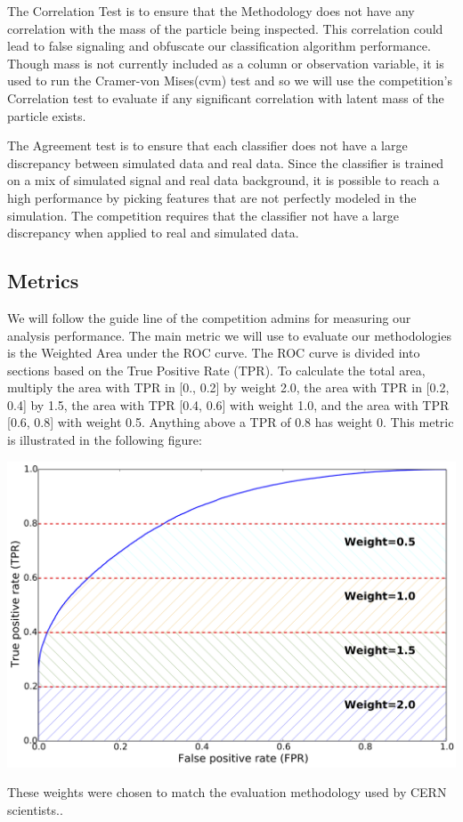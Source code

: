 \documentclass{article} %
\begin{document}
The Correlation Test is to ensure that the Methodology does not have any correlation with the mass of the particle being inspected. This correlation could lead to false signaling and obfuscate our classification algorithm performance. Though mass is not currently included as a column or observation variable, it is used to run the Cramer-von Mises(cvm) test and so we will use the competition's Correlation test to evaluate if any significant correlation with latent mass of the particle exists.

The Agreement test is to ensure that each classifier does not have a large discrepancy between simulated data and real data. Since the classifier is trained on a mix of simulated signal and real data background, it is possible to reach a high performance by picking features that are not perfectly modeled in the simulation. The competition requires that the classifier not have a large discrepancy when applied to real and simulated data. \cite{kaggleComp}

\subsection*{Metrics}
We will follow the guide line of the competition admins for measuring our analysis performance. The main metric we will use to evaluate our methodologies is the Weighted Area under the ROC curve. The ROC curve is divided into sections based on the True Positive Rate (TPR). To calculate the total area, multiply the area with TPR in [0., 0.2] by weight 2.0, the area with TPR in [0.2, 0.4] by 1.5, the area with TPR [0.4, 0.6] with weight 1.0, and the area with TPR [0.6, 0.8] with weight 0.5. Anything above a TPR of 0.8 has weight 0. This metric is illustrated in the following figure:
\begin{center}
	\includegraphics[scale = .3]{roc_optimistic}
\end{center} 
These weights were chosen to match the evaluation methodology used by CERN scientists.\cite{kaggleComp}.

\printbibliography
\end{document}
